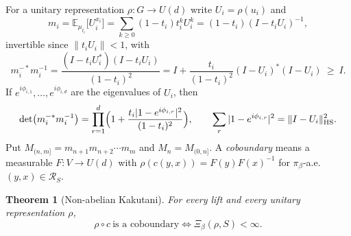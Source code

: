 \documentclass[11pt]{amsart}
\numberwithin{equation}{section}
\newtheorem{theorem}{Theorem}[section]
\theoremstyle{definition}
\theoremstyle{remark}
\newcommand{\cR}{\mathcal{R}}
\newcommand{\HS}{\mathrm{HS}}
\newcommand{\E}{\mathbb{E}}
\begin{document}
For a unitary representation $\rho:G\to U(d)$ write $U_i=\rho(u_i)$ and
\begin{equation}\label{eq:mean}
m_i=\E_{\mu_{t_i}}\bigl[U_i^{x_i}\bigr]=\sum_{k\ge0}(1-t_i)t_i^kU_i^k=(1-t_i)(I-t_iU_i)^{-1},
\end{equation}
invertible since $\|t_iU_i\|<1$, with
\begin{equation}\label{eq:minv}
m_i^{-*}m_i^{-1}=\frac{(I-t_iU_i^*)(I-t_iU_i)}{(1-t_i)^2}=I+\frac{t_i}{(1-t_i)^2}(I-U_i)^*(I-U_i)\ \ge\ I .
\end{equation}
If $e^{i\phi_{i,1}},\dots,e^{i\phi_{i,d}}$ are the eigenvalues of $U_i$, then
\begin{equation}\label{eq:det}
\det\bigl(m_i^{-*}m_i^{-1}\bigr)=\prod_{r=1}^d\Bigl(1+\frac{t_i|1-e^{i\phi_{i,r}}|^2}{(1-t_i)^2}\Bigr),
\qquad
\sum_r|1-e^{i\phi_{i,r}}|^2=\|I-U_i\|_{\HS}^2 .
\end{equation}
Put $M_{(n,m]}=m_{n+1}m_{n+2}\cdots m_m$ and $M_n=M_{(0,n]}$. A \emph{coboundary} means a
measurable $F:V\to U(d)$ with $\rho(c(y,x))=F(y)F(x)^{-1}$ for $\pi_\beta$-a.e.\ $(y,x)\in\cR_S$.

\begin{theorem}[Non-abelian Kakutani]\label{thm:kakutani}
For every lift and every unitary representation $\rho$,
\[
\rho\circ c\ \text{is a coboundary}\iff\Xi_\beta(\rho,S)<\infty .
\]
\end{theorem}
\end{document}
